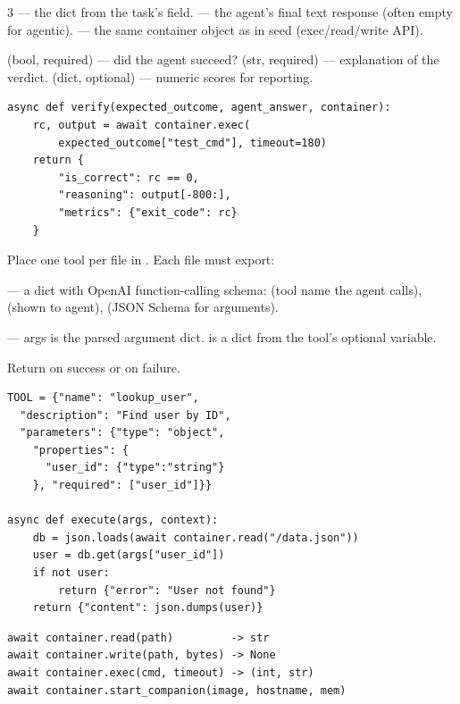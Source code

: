 \documentclass[10pt,landscape]{article}
\begin{document}
\begin{multicols}{3}
 --- the dict from the task's  field.  --- the agent's final text response (often empty for agentic).  --- the same container object as in seed (exec/read/write API).

  (bool, required) --- did the agent succeed?  (str, required) --- explanation of the verdict.  (dict, optional) --- numeric scores for reporting.

\begin{lstlisting}
async def verify(expected_outcome, agent_answer, container):
    rc, output = await container.exec(
        expected_outcome["test_cmd"], timeout=180)
    return {
        "is_correct": rc == 0,
        "reasoning": output[-800:],
        "metrics": {"exit_code": rc}
    }
\end{lstlisting}


Place one tool per file in . Each file must export:

 --- a dict with OpenAI function-calling schema:  (tool name the agent calls),  (shown to agent),  (JSON Schema for arguments).

 --- args is the parsed argument dict.  is a dict from the tool's optional  variable.

Return  on success or  on failure.

\begin{lstlisting}
TOOL = {"name": "lookup_user",
  "description": "Find user by ID",
  "parameters": {"type": "object",
    "properties": {
      "user_id": {"type":"string"}
    }, "required": ["user_id"]}}

async def execute(args, context):
    db = json.loads(await container.read("/data.json"))
    user = db.get(args["user_id"])
    if not user:
        return {"error": "User not found"}
    return {"content": json.dumps(user)}
\end{lstlisting}


\begin{lstlisting}
await container.read(path)         -> str
await container.write(path, bytes) -> None
await container.exec(cmd, timeout) -> (int, str)
await container.start_companion(image, hostname, mem)
\end{lstlisting}


\end{multicols}
\end{document}
